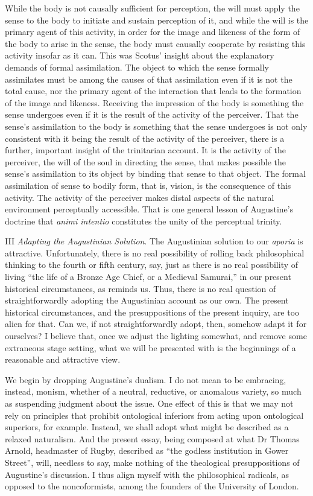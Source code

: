 \documentclass[12pt]{article}
\begin{document}
While the body is not causally sufficient for perception, the will must apply the sense to the body to initiate and sustain perception of it, and while the will is the primary agent of this activity, in order for the image and likeness of the form of the body to arise in the sense, the body must causally cooperate by resisting this activity insofar as it can. This was Scotus' insight about the explanatory demands of formal assimilation. The object to which the sense formally assimilates must be among the causes of that assimilation even if it is not the total cause, nor the primary agent of the interaction that leads to the formation of the image and likeness. Receiving the impression of the body is something the sense undergoes even if it is the result of the activity of the perceiver. That the sense's assimilation to the body is something that the sense undergoes is not only consistent with it being the result of the activity of the perceiver, there is a further, important insight of the trinitarian account. It is the activity of the perceiver, the will of the soul in directing the sense, that makes possible the sense's assimilation to its object by binding that sense to that object. The formal assimilation of sense to bodily form, that is, vision, is the consequence of this activity. The activity of the perceiver makes distal aspects of the natural environment perceptually accessible. That is one general lesson of Augustine's doctrine that \emph{animi intentio} constitutes the unity of the perceptual trinity.

III \emph{Adapting the Augustinian Solution}. The Augustinian solution to our \emph{aporia} is attractive. Unfortunately, there is no real possibility of rolling back philosophical thinking to the fourth or fifth century, say, just as there is no real possibility of living ``the life of a Bronze Age Chief, or a Medieval Samurai,'' in our present historical circumstances, as \citet[140]{Williams:1981rt} reminds us. Thus, there is no real question of straightforwardly adopting the Augustinian account as our own. The present historical circumstances, and the presuppositions of the present inquiry, are too alien for that. Can we, if not straightforwardly adopt, then, somehow adapt it for ourselves? I believe that, once we adjust the lighting somewhat, and remove some extraneous stage setting, what we will be presented with is the beginnings of a reasonable and attractive view.

We begin by dropping Augustine's dualism. I do not mean to be embracing, instead, monism, whether of a neutral, reductive, or anomalous variety, so much as suspending judgment about the issue. One effect of this is that we may not rely on principles that prohibit ontological inferiors from acting upon ontological superiors, for example. Instead, we shall adopt what might be described as a relaxed naturalism. And the present essay, being composed at what Dr Thomas Arnold, headmaster of Rugby, described as ``the godless institution in Gower Street'', will, needless to say, make nothing of the theological presuppositions of Augustine's discussion. I thus align myself with the philosophical radicals, as opposed to the noncoformists, among the founders of the University of London.
\end{document}
